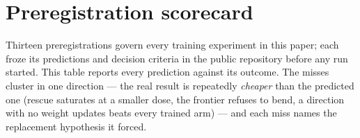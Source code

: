\section{Preregistration scorecard}
\label{app:scorecard}
Thirteen preregistrations govern every training experiment in this paper;
each froze its predictions and decision criteria in the public repository
before any run started. This table reports every prediction against its
outcome. The misses cluster in one direction --- the real result is
repeatedly \emph{cheaper} than the predicted one (rescue saturates at a
smaller dose, the frontier refuses to bend, a direction with no weight updates beats every
trained arm) --- and each miss names the replacement hypothesis it forced.

